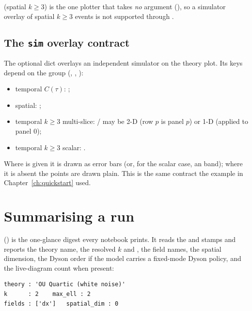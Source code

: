 \begin{gotcha}
 (spatial $k\ge 3$) is the one plotter that takes \emph{no}
 argument (), so a simulator overlay of
spatial $k\ge 3$ events is not supported through .
\end{gotcha}

\subsection{The \texttt{sim} overlay contract}

The optional  dict overlays an independent simulator on the theory plot.
Its keys depend on the group (, ,
):

\begin{itemize}
  \item temporal $C(\tau)$: ;
  \item spatial: ;
  \item temporal $k\ge 3$ multi-slice:  /  may be 2-D
         (row $p$ is panel $p$) or 1-D (applied to panel 0);
  \item temporal $k\ge 3$ scalar: .
\end{itemize}

Where  is given it is drawn as error bars (or, for the scalar case,
an  band); where it is absent the points are drawn plain. This is
the same contract the example in Chapter~\ref{ch:quickstart} used.

\section{Summarising a run}

 () is the
one-glance digest every notebook prints. It reads the  and
 stamps and reports the theory name, the resolved $k$ and
, the field names, the spatial dimension, the Dyson order if the
model carries a fixed-mode Dyson policy, and the live-diagram count
 when present:

\begin{lstlisting}[style=console]
theory : 'OU Quartic (white noise)'
k      : 2    max_ell : 2
fields : ['dx']   spatial_dim : 0
\end{lstlisting}

